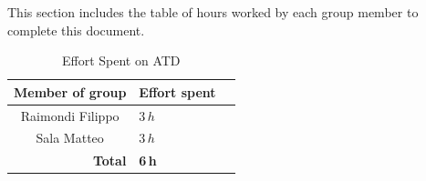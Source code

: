 \noindent This section includes the table of hours worked by each group member to complete this document.

\begin{table}[h!]
\centering
\begin{tabular}{c|l|c}
\hline
Member of group & \multicolumn{1}{c}{Effort spent} \\
\hline
\multirow{1}{*}{Raimondi Filippo} 
 & $3\,h$ \\
\hline
\multirow{1}{*}{Sala Matteo} 
 & $3\,h$ \\
\hline
\multicolumn{1}{r|}{\textbf{Total}} & \textbf{6\,h} \\
\hline
\end{tabular}
\caption{Effort Spent on ATD}
\end{table}